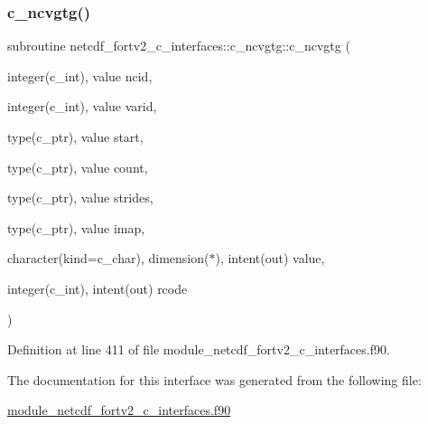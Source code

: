 \subsubsection{\texorpdfstring{c\+\_\+ncvgtg()}{c\_ncvgtg()}}
{\footnotesize\ttfamily subroutine netcdf\+\_\+fortv2\+\_\+c\+\_\+interfaces\+::c\+\_\+ncvgtg\+::c\+\_\+ncvgtg (\begin{DoxyParamCaption}\item[{integer(c\+\_\+int), value}]{ncid,  }\item[{integer(c\+\_\+int), value}]{varid,  }\item[{type(c\+\_\+ptr), value}]{start,  }\item[{type(c\+\_\+ptr), value}]{count,  }\item[{type(c\+\_\+ptr), value}]{strides,  }\item[{type(c\+\_\+ptr), value}]{imap,  }\item[{character(kind=c\+\_\+char), dimension($\ast$), intent(out)}]{value,  }\item[{integer(c\+\_\+int), intent(out)}]{rcode }\end{DoxyParamCaption})}



Definition at line 411 of file module\+\_\+netcdf\+\_\+fortv2\+\_\+c\+\_\+interfaces.\+f90.



The documentation for this interface was generated from the following file\+:\begin{DoxyCompactItemize}
\item 
\hyperlink{module__netcdf__fortv2__c__interfaces_8f90}{module\+\_\+netcdf\+\_\+fortv2\+\_\+c\+\_\+interfaces.\+f90}\end{DoxyCompactItemize}
